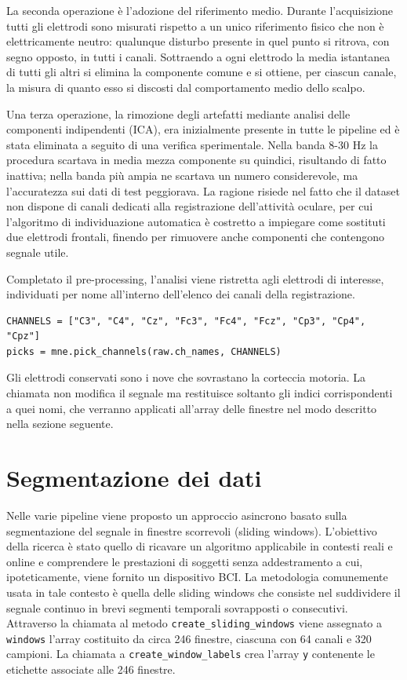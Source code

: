 La seconda operazione è l’adozione del riferimento medio. Durante l’acquisizione tutti gli elettrodi sono misurati rispetto a un unico riferimento fisico che non è elettricamente neutro: qualunque disturbo presente in quel punto si ritrova, con segno opposto, in tutti i canali. Sottraendo a ogni elettrodo la media istantanea di tutti gli altri si elimina la componente comune e si ottiene, per ciascun canale, la misura di quanto esso si discosti dal comportamento medio dello scalpo. 

Una terza operazione, la rimozione degli artefatti mediante analisi delle componenti indipendenti (ICA), era inizialmente presente in tutte le pipeline ed è stata eliminata a seguito di una verifica sperimentale. Nella banda 8-30 Hz la procedura scartava in media mezza componente su quindici, risultando di fatto inattiva; nella banda più ampia ne scartava un numero considerevole, ma l’accuratezza sui dati di test peggiorava. La ragione risiede nel fatto che il dataset non dispone di canali dedicati alla registrazione dell’attività oculare, per cui l’algoritmo di individuazione automatica è costretto a impiegare come sostituti due elettrodi frontali, finendo per rimuovere anche componenti che contengono segnale utile.

Completato il pre-processing, l’analisi viene ristretta agli elettrodi di interesse, individuati per nome all’interno dell’elenco dei canali della registrazione.

\begin{lstlisting}
CHANNELS = ["C3", "C4", "Cz", "Fc3", "Fc4", "Fcz", "Cp3", "Cp4", "Cpz"]
picks = mne.pick_channels(raw.ch_names, CHANNELS)
\end{lstlisting}

Gli elettrodi conservati sono i nove che sovrastano la corteccia motoria. La chiamata non modifica il segnale ma restituisce soltanto gli indici corrispondenti a quei nomi, che verranno applicati all’array delle finestre nel modo descritto nella sezione seguente.


\section{Segmentazione dei dati}
Nelle varie pipeline viene proposto un approccio asincrono basato sulla segmentazione del segnale in finestre scorrevoli (sliding windows). L’obiettivo della ricerca è stato quello di ricavare un algoritmo applicabile in contesti reali e online e comprendere le prestazioni di soggetti senza addestramento a cui, ipoteticamente, viene fornito un dispositivo BCI. La metodologia comunemente usata in tale contesto è quella delle sliding windows che consiste nel suddividere il segnale continuo in brevi segmenti temporali sovrapposti o consecutivi. Attraverso la chiamata al metodo \texttt{create\_sliding\_windows} viene assegnato a \texttt{windows} l’array costituito da circa 246 finestre, ciascuna con 64 canali e 320 campioni. La chiamata a \texttt{create\_window\_labels} crea l’array \texttt{y} contenente le etichette associate alle 246 finestre.

